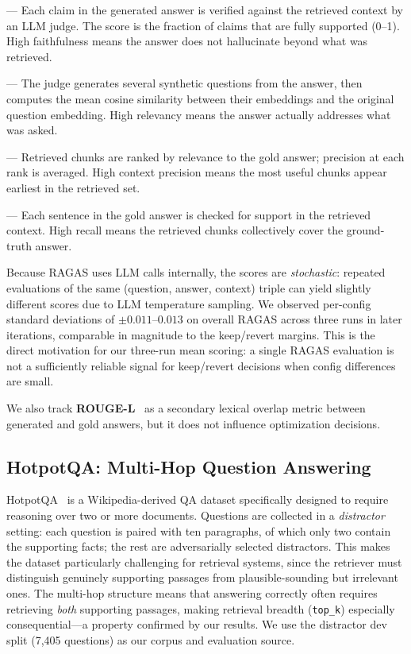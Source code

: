 \documentclass[11pt,a4paper]{article}
\begin{document}
\begin{description}[leftmargin=2em]
  \item[Faithfulness] --- Each claim in the generated answer is verified against
    the retrieved context by an LLM judge. The score is the fraction of claims
    that are fully supported (0--1). High faithfulness means the answer does not
    hallucinate beyond what was retrieved.
  \item[Answer Relevancy] --- The judge generates several synthetic questions
    from the answer, then computes the mean cosine similarity between their
    embeddings and the original question embedding. High relevancy means the
    answer actually addresses what was asked.
  \item[Context Precision] --- Retrieved chunks are ranked by relevance to the
    gold answer; precision at each rank is averaged. High context precision means
    the most useful chunks appear earliest in the retrieved set.
  \item[Context Recall] --- Each sentence in the gold answer is checked for
    support in the retrieved context. High recall means the retrieved chunks
    collectively cover the ground-truth answer.
\end{description}

Because RAGAS uses LLM calls internally, the scores are \emph{stochastic}:
repeated evaluations of the same (question, answer, context) triple can yield
slightly different scores due to LLM temperature sampling. We observed
per-config standard deviations of $\pm0.011$--$0.013$ on overall RAGAS across
three runs in later iterations, comparable in magnitude to the keep/revert
margins. This is the direct motivation for our three-run mean scoring: a single
RAGAS evaluation is not a sufficiently reliable signal for keep/revert decisions
when config differences are small.

We also track \textbf{ROUGE-L}~\cite{lin2004rouge} as a secondary lexical
overlap metric between generated and gold answers, but it does not influence
optimization decisions.

\subsection{HotpotQA: Multi-Hop Question Answering}

HotpotQA~\cite{yang2018hotpotqa} is a Wikipedia-derived QA dataset specifically
designed to require reasoning over two or more documents. Questions are collected
in a \emph{distractor} setting: each question is paired with ten paragraphs, of
which only two contain the supporting facts; the rest are adversarially selected
distractors. This makes the dataset particularly challenging for retrieval
systems, since the retriever must distinguish genuinely supporting passages from
plausible-sounding but irrelevant ones. The multi-hop structure means that
answering correctly often requires retrieving \emph{both} supporting passages,
making retrieval breadth (\texttt{top\_k}) especially consequential---a property
confirmed by our results. We use the distractor dev split (7,405 questions) as
our corpus and evaluation source.
\end{document}
